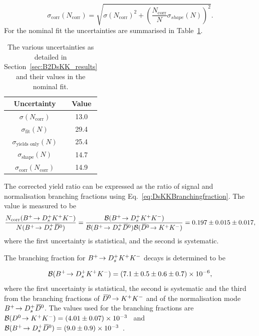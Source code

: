 \begin{equation}
\sigma_{\text{corr}}(N_{\text{corr}}) =  \sqrt{  \sigma(N_{\text{corr}})^{2} +  \left( \frac{N_{\text{corr}}}{N} \sigma_{shape}(N) \right)^{2}}.
\end{equation}
For the nominal fit the uncertainties are summarised in Table~\ref{table:DsKK_fit_errors}.

\begin{table}[!ht]
\begin{center}
\begin{tabular}{  c | c   }
\hline
Uncertainty                             &  Value \\
\hline 
$\sigma(N_{\text{corr}})$               & 13.0\\
$\sigma_{\text{fit}}(N)$                & 29.4\\
$\sigma_{\text{yields only}}(N)$        & 25.4\\
$\sigma_{\text{shape}}(N)$              & 14.7 \\ 
\hline
$\sigma_{\text{corr}}(N_{\text{corr}})$ & 14.9 \\ 
\hline
\end{tabular}
\caption{The various uncertainties as detailed in Section~\ref{sec:B2DsKK_results} and their values in the nominal fit.}
\label{table:DsKK_fit_errors}
\end{center}
\end{table}

The corrected yield ratio can be expressed as the ratio of signal and normalisation branching fractions using Eq.~\ref{eq:DsKKBranchingfraction}. The value is measured to be 
\begin{equation}
\frac{ N_{\text{corr}}({{{B}^+}}\!\rightarrow {\ensuremath{{D}^+_{s}}}{\ensuremath{{K}^+}}{\ensuremath{{K}^-}}) }{ N({{{B}^+}}\!\rightarrow {\ensuremath{{D}^+_{s}}}{\ensuremath{{\kern 0.2em\overline{\kern -0.2em D}{}}{}^0}}) } = \frac{\mathcal{B}({{{B}^+}}\!\rightarrow {\ensuremath{{D}^+_{s}}}{\ensuremath{{K}^+}}{\ensuremath{{K}^-}})}{\mathcal{B}({{{B}^+}}\!\rightarrow {\ensuremath{{D}^+_{s}}}{\ensuremath{{\kern 0.2em\overline{\kern -0.2em D}{}}{}^0}})\mathcal{B}({{\kern 0.2em\overline{\kern -0.2em D}{}}{}^0}\!\rightarrow {\ensuremath{{K}^+}}{\ensuremath{{K}^-}})}  = 0.197 \pm 0.015 \pm 0.017, 
\end{equation}
where the first uncertainty is statistical, and the second is systematic.

The branching fraction for ${{{B}^+}}\!\rightarrow {\ensuremath{{D}^+_{s}}}{\ensuremath{{K}^+}}{\ensuremath{{K}^-}}$ decays is determined to be 

\begin{equation}
\mathcal{B}({{{B}^+}}\!\rightarrow {\ensuremath{{D}^+_{s}}}{\ensuremath{{K}^+}}{\ensuremath{{K}^-}}) = (7.1 \pm 0.5 \pm 0.6 \pm 0.7) \times 10^{-6},
\end{equation}
where the first uncertainty is statistical, the second is systematic and the third from the branching fractions of ${{\kern 0.2em\overline{\kern -0.2em D}{}}{}^0}\!\rightarrow {\ensuremath{{K}^+}}{\ensuremath{{K}^-}}$ and of the normalisation mode ${{{B}^+}}\!\rightarrow {\ensuremath{{D}^+_{s}}}{\ensuremath{{\kern 0.2em\overline{\kern -0.2em D}{}}{}^0}}$. 
The values used for the branching fractions are $\mathcal{B}({{D}^0}\!\rightarrow {\ensuremath{{K}^+}}{\ensuremath{{K}^-}}) = (4.01 \pm 0.07)\times10^{-3}$~\cite{PDG2016} and $\mathcal{B}({{{B}^+}}\!\rightarrow {\ensuremath{{D}^+_{s}}}{\ensuremath{{\kern 0.2em\overline{\kern -0.2em D}{}}{}^0}}) = (9.0 \pm 0.9)\times10^{-3}$~\cite{PDG2016}. 

